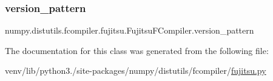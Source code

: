 \subsubsection{\texorpdfstring{version\+\_\+pattern}{version\_pattern}}
{\footnotesize\ttfamily numpy.\+distutils.\+fcompiler.\+fujitsu.\+Fujitsu\+F\+Compiler.\+version\+\_\+pattern\hspace{0.3cm}{\ttfamily [static]}}



The documentation for this class was generated from the following file\+:\begin{DoxyCompactItemize}
\item 
venv/lib/python3./site-\/packages/numpy/distutils/fcompiler/\hyperlink{fujitsu_8py}{fujitsu.\+py}\end{DoxyCompactItemize}
